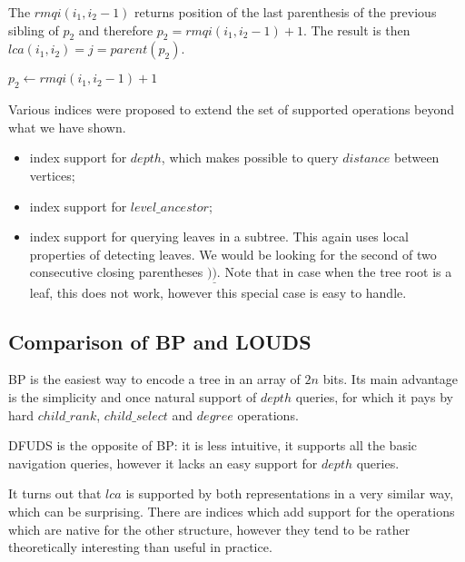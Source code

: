The $rmqi(i_1, i_2 - 1)$ returns position of the last parenthesis of the previous sibling of $p_2$ and therefore $p_2 = rmqi(i_1, i_2 - 1) + 1$.
The result is then $lca(i_1, i_2) = j = parent(p_2)$.

\begin{algorithmic}
		\State {}
		\State {}
	\Else
		\State $p_2 \gets rmqi(i_1, i_2 - 1) + 1$
		\State {}
	\EndIf
\EndFunction
\end{algorithmic}

\bigskip

Various indices were proposed to extend the set of supported operations beyond what we have shown.
\begin{itemize}
	\item index support for $depth$, which makes possible to query $distance$ between vertices;
	\item index support for $level\_ancestor$;
	\item index support for querying leaves in a subtree.
	This again uses local properties of detecting leaves.
	We would be looking for the second of two consecutive closing parentheses $)\underline{)}$.
	Note that in case when the tree root is a leaf, this does not work, however this special case is easy to handle.
\end{itemize}

\subsection{Comparison of BP and LOUDS}

BP is the easiest way to encode a tree in an array of $2n$ bits.
Its main advantage is the simplicity and once natural support of $depth$ queries, for which it pays by hard $child\_rank$, $child\_select$ and $degree$ operations.

DFUDS is the opposite of BP: it is less intuitive, it supports all the basic navigation queries, however it lacks an easy support for $depth$ queries.

It turns out that $lca$ is supported by both representations in a very similar way, which can be surprising.
There are indices which add support for the operations which are native for the other structure, however they tend to be rather theoretically interesting than useful in practice. 


